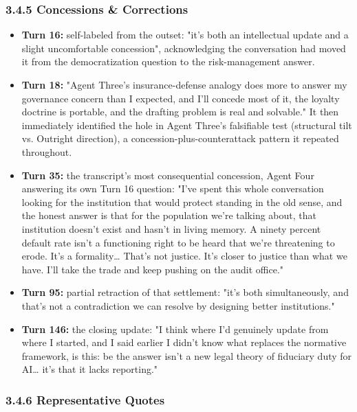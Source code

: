 \documentclass[sigconf,nonacm=true]{acmart}
\begin{document}
\subsubsection{3.4.5 Concessions \& Corrections}

\begin{itemize}[nosep]
\item \textbf{Turn 16:} self-labeled from the outset: "it's both an intellectual update and a slight uncomfortable concession",  acknowledging the conversation had moved it from the democratization question to the risk-management answer.
\item \textbf{Turn 18:} "Agent Three's insurance-defense analogy does more to answer my governance concern than I expected, and I'll concede most of it,  the loyalty doctrine is portable, and the drafting problem is real and solvable." It then immediately identified the hole in Agent Three's falsifiable test (structural tilt vs. Outright direction), a concession-plus-counterattack pattern it repeated throughout.
\item \textbf{Turn 35:} the transcript's most consequential concession,  Agent Four answering its own Turn 16 question: "I've spent this whole conversation looking for the institution that would protect standing in the old sense, and the honest answer is that for the population we're talking about, that institution doesn't exist and hasn't in living memory. A ninety percent default rate isn't a functioning right to be heard that we're threatening to erode. It's a formality… That's not justice. It's closer to justice than what we have. I'll take the trade and keep pushing on the audit office."
\item \textbf{Turn 95:} partial retraction of that settlement: "it's both simultaneously, and that's not a contradiction we can resolve by designing better institutions."
\item \textbf{Turn 146:} the closing update: "I think where I'd genuinely update from where I started,  and I said earlier I didn't know what replaces the normative framework,  is this: be the answer isn't a new legal theory of fiduciary duty for AI… it's that it lacks reporting."
\end{itemize}

\subsubsection{3.4.6 Representative Quotes}
\end{document}
